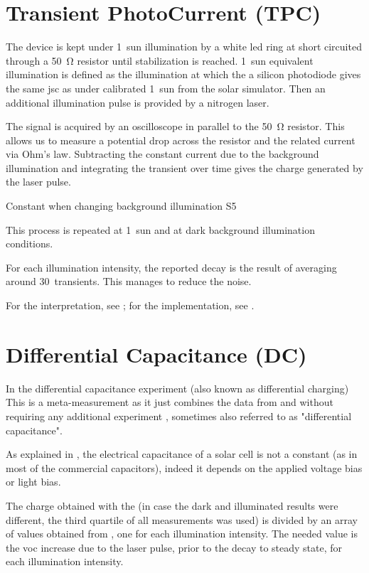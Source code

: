 \section{Transient PhotoCurrent (TPC)}
\cite{ORegan2004}
	The device is kept under 1~sun illumination by a white \gls{led} ring at short circuited through a \SI{50}{\ohm} resistor until stabilization is reached. 1~sun equivalent illumination is defined as the illumination at which the a silicon photodiode gives the same \gls{jsc} as under calibrated 1~sun from the solar simulator. Then an additional illumination pulse is provided by a nitrogen laser.

	The signal is acquired by an oscilloscope in parallel to the \SI{50}{\ohm} resistor. This allows us to measure a potential drop across the resistor and the related current via Ohm's law. Subtracting the constant current due to the background illumination and integrating the transient over time gives the charge generated by the laser pulse.
	
	Constant when changing background illumination S5 \cite{Du2018}

	This process is repeated at 1~sun and at dark background illumination conditions.

	For each illumination intensity, the reported decay is the result of averaging around 30~transients. This manages to reduce the noise.

	For the interpretation, see ; for the implementation, see .

\section{Differential Capacitance (DC)}
	In the differential capacitance experiment (also known as differential charging)
	This is a meta-measurement as it just combines the data from  and  without requiring any additional experiment \cite{ORegan2005,ORegan2006,Shuttle2008}, sometimes also referred to as "differential capacitance".

	As explained in , the electrical capacitance of a solar cell is not a constant (as in most of the commercial capacitors), indeed it depends on the applied voltage bias or light bias.

	The charge obtained with the  (in case the dark and illuminated results were different, the third quartile of all  measurements was used) is divided by an array of values obtained from , one for each illumination intensity. The needed value is the \gls{voc} increase due to the laser pulse, prior to the decay to steady state, for each illumination intensity.

